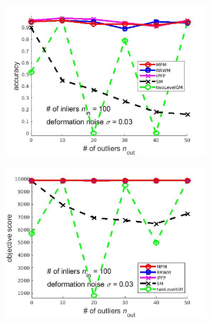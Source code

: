 \documentclass[
	fontsize=12pt,
	paper=a4,
	twoside=false,
	numbers=noenddot,
	plainheadsepline,
	toc=listof,
	toc=bibliography
]{scrartcl}
\begin{document}
\begin{figure}[ht] 
	\begin{subfigure}[b]{0.3\textwidth}
		\centering
		\includegraphics[scale=0.25]{"fig_ver2108/syntheticPointSets/outliertest_n50/accuracy_greedy"} 
	\end{subfigure}%
	\begin{subfigure}[b]{0.3\textwidth}
		\centering
		\includegraphics[scale=0.25]{"fig_ver2108/syntheticPointSets/outliertest_n50/score_greedy"} 
	\end{subfigure} 
	\begin{subfigure}[b]{0.3\textwidth}
		\centering

\end{subfigure}
\end{figure}
\end{document}

